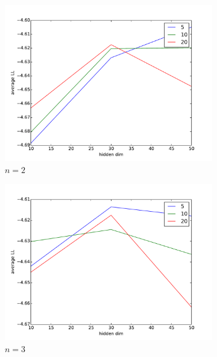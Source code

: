 \documentclass[psamsfonts]{amsart}
\theoremstyle{definition}
\theoremstyle{remark}
\numberwithin{equation}{section}
\begin{document}
\begin{figure}
	\begin{subfigure}[b]{0.3\textwidth}
		\includegraphics[width=\textwidth]{code/hw1_test_n2.pdf}
		\caption{$n=2$}
	\end{subfigure}
	\begin{subfigure}[b]{0.3\textwidth}
		\includegraphics[width=\textwidth]{code/hw1_test_n3.pdf}
		\caption{$n=3$}
	\end{subfigure}
	\begin{subfigure}[b]{0.3\textwidth}

\end{subfigure}
\end{figure}
\end{document}

